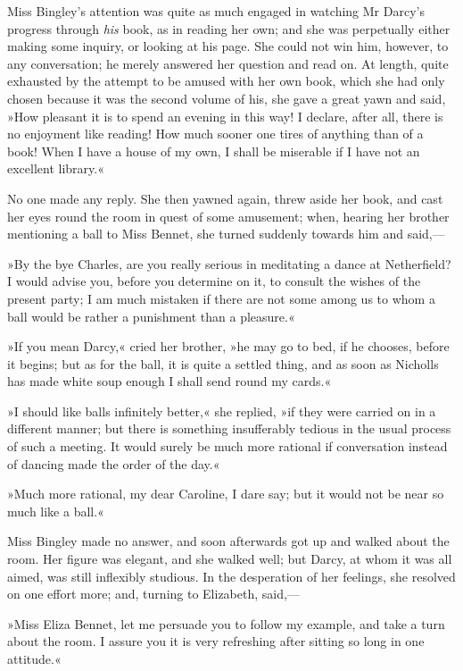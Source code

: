 Miss Bingley's attention was quite as much engaged in watching Mr Darcy's progress through \textit{his} book, as in reading her own; and she was perpetually either making some inquiry, or looking at his page. She could not win him, however, to any conversation; he merely answered her question and read on. At length, quite exhausted by the attempt to be amused with her own book, which she had only chosen because it was the second volume of his, she gave a great yawn and said, »How pleasant it is to spend an evening in this way! I declare, after all, there is no enjoyment like reading! How much sooner one tires of anything than of a book! When I have a house of my own, I shall be miserable if I have not an excellent library.«

No one made any reply. She then yawned again, threw aside her book, and cast her eyes round the room in quest of some amusement; when, hearing her brother mentioning a ball to Miss Bennet, she turned suddenly towards him and said,—

»By the bye Charles, are you really serious in meditating a dance at Netherfield? I would advise you, before you determine on it, to consult the wishes of the present party; I am much mistaken if there are not some among us to whom a ball would be rather a punishment than a pleasure.«

»If you mean Darcy,« cried her brother, »he may go to bed, if he chooses, before it begins; but as for the ball, it is quite a settled thing, and as soon as Nicholls has made white soup enough I shall send round my cards.«

»I should like balls infinitely better,« she replied, »if they were carried on in a different manner; but there is something insufferably tedious in the usual process of such a meeting. It would surely be much more rational if conversation instead of dancing made the order of the day.«

»Much more rational, my dear Caroline, I dare say; but it would not be near so much like a ball.«

Miss Bingley made no answer, and soon afterwards got up and walked about the room. Her figure was elegant, and she walked well; but Darcy, at whom it was all aimed, was still inflexibly studious. In the desperation of her feelings, she resolved on one effort more; and, turning to Elizabeth, said,—

»Miss Eliza Bennet, let me persuade you to follow my example, and take a turn about the room. I assure you it is very refreshing after sitting so long in one attitude.«


